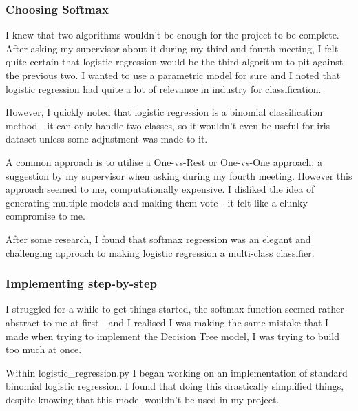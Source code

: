 \documentclass[letterpaper,10pt]{article}
\begin{document}
\subsubsection{Choosing Softmax}
I knew that two algorithms wouldn't be enough for the project to be complete. After asking my supervisor about it during my third and fourth meeting, I felt quite certain that logistic regression would be the third algorithm to pit against the previous two. I wanted to use a parametric model for sure and I noted that logistic regression had quite a lot of relevance in industry for classification. \par
However, I quickly noted that logistic regression is a binomial classification method - it can only handle two classes, so it wouldn't even be useful for iris dataset unless some adjustment was made to it. \par
A common approach is to utilise a One-vs-Rest or One-vs-One approach, a suggestion by my supervisor when asking during my fourth meeting. However this approach seemed to me, computationally expensive. I disliked the idea of generating multiple models and making them vote - it felt like a clunky compromise to me. \par 
After some research, I found that softmax regression was an elegant and challenging approach to making logistic regression a multi-class classifier. \par

\subsubsection{Implementing step-by-step} 
I struggled for a while to get things started, the softmax function seemed rather abstract to me at first - and I realised I was making the same mistake that I made when trying to implement the Decision Tree model, I was trying to build too much at once. \par
Within logistic\_regression.py I began working on an implementation of standard binomial logistic regression. I found that doing this drastically simplified things, despite knowing that this model wouldn't be used in my project. \par
\end{document}
